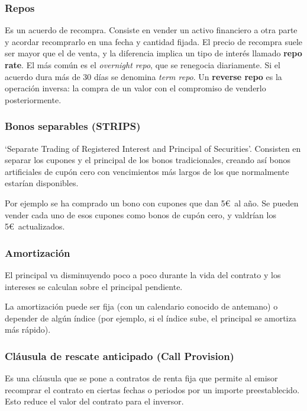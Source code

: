 \subsubsection{Repos}
Es un acuerdo de recompra. Consiste en vender un activo financiero a otra parte y acordar recomprarlo en una fecha y cantidad fijada. El precio de recompra suele ser mayor que el de venta, y la diferencia implica un tipo de interés llamado \textbf{repo rate}. El más común es el \textit{overnight repo}, que se renegocia diariamente. Si el acuerdo dura más de 30 días se denomina \textit{term repo}. Un \textbf{reverse repo} es la operación inversa: la compra de un valor con el compromiso de venderlo posteriormente.



\subsubsection{Bonos separables (STRIPS)}
‘Separate Trading of Registered Interest and Principal of Securities’. Consisten en separar los cupones y el principal de los bonos tradicionales, creando así bonos artificiales de cupón cero con vencimientos más largos de los que normalmente estarían disponibles.

Por ejemplo se ha comprado un bono con cupones que dan 5\euro\ al año. Se pueden vender cada uno de esos cupones como bonos de cupón cero, y valdrían los 5\euro\ actualizados.



\subsubsection{Amortización}
El principal va disminuyendo poco a poco durante la vida del contrato y los intereses se calculan sobre el principal pendiente. 

La amortización puede ser fija (con un calendario conocido de antemano) o depender de algún índice (por ejemplo, si el índice sube, el principal se amortiza más rápido).

\subsubsection{Cláusula de rescate anticipado (Call Provision)}
Es una cláusula que se pone a contratos de renta fija que permite al emisor recomprar el contrato en ciertas fechas o periodos por un importe preestablecido. Esto reduce el valor del contrato para el inversor.






